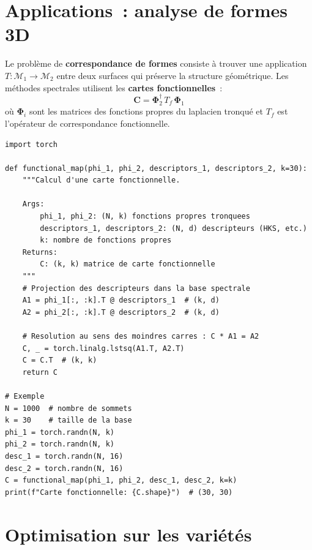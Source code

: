 \section{Applications~: analyse de formes 3D}

\begin{definition}
Le probl\`eme de \textbf{correspondance de formes} consiste \`a trouver une
application $T: \mathcal{M}_1 \to \mathcal{M}_2$ entre deux surfaces qui
pr\'eserve la structure g\'eom\'etrique. Les m\'ethodes spectrales utilisent
les \textbf{cartes fonctionnelles}~:
\[
    \mathbf{C} = \boldsymbol{\Phi}_2^\dagger\, T_f\, \boldsymbol{\Phi}_1
\]
o\`u $\boldsymbol{\Phi}_i$ sont les matrices des fonctions propres du laplacien
tronqu\'e et $T_f$ est l'op\'erateur de correspondance fonctionnelle.
\end{definition}

\begin{codeblock}[title=\textbf{Cartes fonctionnelles pour la correspondance de formes}]
\begin{verbatim}
import torch

def functional_map(phi_1, phi_2, descriptors_1, descriptors_2, k=30):
    """Calcul d'une carte fonctionnelle.

    Args:
        phi_1, phi_2: (N, k) fonctions propres tronquees
        descriptors_1, descriptors_2: (N, d) descripteurs (HKS, etc.)
        k: nombre de fonctions propres
    Returns:
        C: (k, k) matrice de carte fonctionnelle
    """
    # Projection des descripteurs dans la base spectrale
    A1 = phi_1[:, :k].T @ descriptors_1  # (k, d)
    A2 = phi_2[:, :k].T @ descriptors_2  # (k, d)

    # Resolution au sens des moindres carres : C * A1 = A2
    C, _ = torch.linalg.lstsq(A1.T, A2.T)
    C = C.T  # (k, k)
    return C

# Exemple
N = 1000  # nombre de sommets
k = 30    # taille de la base
phi_1 = torch.randn(N, k)
phi_2 = torch.randn(N, k)
desc_1 = torch.randn(N, 16)
desc_2 = torch.randn(N, 16)
C = functional_map(phi_1, phi_2, desc_1, desc_2, k=k)
print(f"Carte fonctionnelle: {C.shape}")  # (30, 30)
\end{verbatim}
\end{codeblock}

\section{Optimisation sur les vari\'et\'es}

